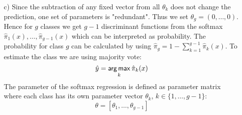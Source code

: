 \documentclass[a4paper]{article}
\begin{document}
{\begin{enumerate}
  \item[c)]
  Since the subtraction of any fixed vector from all $\theta_k$ does not change the prediction, one set of parameters is "redundant". Thus we set $\theta_g = (0,\dots,0).$
    Hence for $g$ classes we get $g - 1$ discriminant functions from the softmax $\hat{\pi}_1(x), \dots, \hat{\pi}_{g-1}(x)$ which can be interpreted as probability. The probability for class $g$ can be calculated by using $\hat{\pi}_g = 1 - \sum_{k = 1}^{g-1} \hat{\pi}_k(x)$. To estimate the class we are using majority vote:
    $$
    \hat{y} = \mathop{\sf arg\,max}_k \hat{\pi}_k(x)
    $$
    The parameter of the softmax regression is defined as parameter matrix where each class has its own parameter vector $\theta_k$, $k \in \{1, \dots, g-1\}$:
    $$
    \theta = [\theta_1, \dots, \theta_{g-1}]
    $$













\end{enumerate}

}
\end{document}
